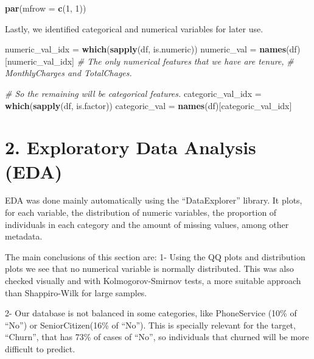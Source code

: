 \documentclass[
]{article}
\newenvironment{Shaded}{\begin{snugshade}}{\end{snugshade}}
\newcommand{\AttributeTok}[1]{\textcolor[rgb]{0.13,0.29,0.53}{#1}}
\newcommand{\CommentTok}[1]{\textcolor[rgb]{0.56,0.35,0.01}{\textit{#1}}}
\newcommand{\DecValTok}[1]{\textcolor[rgb]{0.00,0.00,0.81}{#1}}
\newcommand{\FunctionTok}[1]{\textcolor[rgb]{0.13,0.29,0.53}{\textbf{#1}}}
\newcommand{\NormalTok}[1]{#1}
\newcommand{\OtherTok}[1]{\textcolor[rgb]{0.56,0.35,0.01}{#1}}
\begin{document}
\begin{Shaded}
\begin{Highlighting}[]
\FunctionTok{par}\NormalTok{(}\AttributeTok{mfrow =} \FunctionTok{c}\NormalTok{(}\DecValTok{1}\NormalTok{, }\DecValTok{1}\NormalTok{))}
\end{Highlighting}
\end{Shaded}

Lastly, we identified categorical and numerical variables for later use.

\begin{Shaded}
\begin{Highlighting}[]
\NormalTok{numeric\_val\_idx }\OtherTok{=} \FunctionTok{which}\NormalTok{(}\FunctionTok{sapply}\NormalTok{(df, is.numeric))}
\NormalTok{numeric\_val }\OtherTok{=} \FunctionTok{names}\NormalTok{(df)[numeric\_val\_idx]}
\CommentTok{\# The only numerical features that we have are tenure,}
\CommentTok{\# MonthlyCharges and TotalChages.}

\CommentTok{\# So the remaining will be categorical features.}
\NormalTok{categoric\_val\_idx }\OtherTok{=} \FunctionTok{which}\NormalTok{(}\FunctionTok{sapply}\NormalTok{(df, is.factor))}
\NormalTok{categoric\_val }\OtherTok{=} \FunctionTok{names}\NormalTok{(df)[categoric\_val\_idx]}
\end{Highlighting}
\end{Shaded}

\hypertarget{exploratory-data-analysis-eda}{%
\section{2. Exploratory Data Analysis
(EDA)}\label{exploratory-data-analysis-eda}}

EDA was done mainly automatically using the ``DataExplorer'' library. It
plots, for each variable, the distribution of numeric variables, the
proportion of individuals in each category and the amount of missing
values, among other metadata.

The main conclusions of this section are: 1- Using the QQ plots and
distribution plots we see that no numerical variable is normally
distributed. This was also checked visually and with Kolmogorov-Smirnov
tests, a more suitable approach than Shappiro-Wilk for large samples.

2- Our database is not balanced in some categories, like PhoneService
(10\% of ``No'') or SeniorCitizen(16\% of ``No''). This is specially
relevant for the target, ``Churn'', that has 73\% of cases of ``No'', so
individuals that churned will be more difficult to predict.
\end{document}
